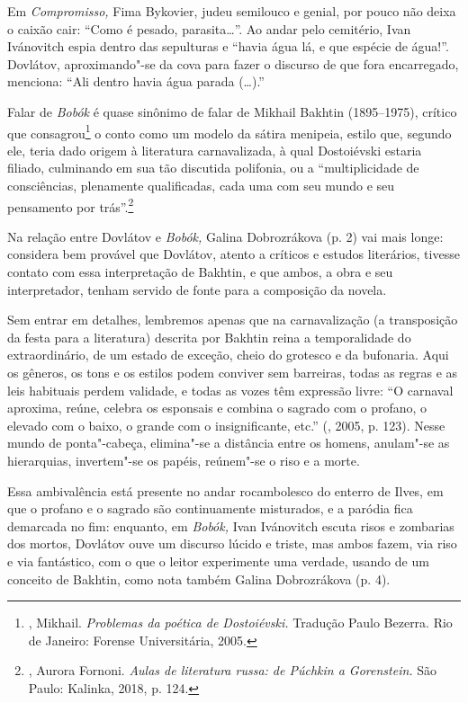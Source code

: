 Em \emph{Compromisso,} Fima Bykovier, judeu semilouco e genial, por
pouco não deixa o caixão cair: ``Como é pesado, parasita\ldots{}''. Ao andar
pelo cemitério, Ivan Ivánovitch espia dentro das sepulturas e ``havia
água lá, e que espécie de água!''. Dovlátov, aproximando"-se da cova para
fazer o discurso de que fora encarregado, menciona: ``Ali dentro havia
água parada (\ldots{}).''

Falar de \emph{Bobók} é quase sinônimo de falar de Mikhail Bakhtin
(1895--1975), crítico que consagrou\footnote{, Mikhail.
  \emph{Problemas da poética de Dostoiévski.} Tradução Paulo Bezerra.
  Rio de Janeiro: Forense Universitária, 2005.} o conto como um modelo
da sátira menipeia, estilo que, segundo ele, teria dado origem à
literatura carnavalizada, à qual Dostoiévski estaria filiado, culminando
em sua tão discutida polifonia, ou a ``multiplicidade de consciências,
plenamente qualificadas, cada uma com seu mundo e seu pensamento por
trás''.\footnote{, Aurora Fornoni. \emph{Aulas de literatura
  russa: de Púchkin a Gorenstein.} São Paulo: Kalinka, 2018, p. 124.}

Na relação entre Dovlátov e \emph{Bobók,} Galina Dobrozrákova (p. 2) vai
mais longe: considera bem provável que Dovlátov, atento a críticos e
estudos literários, tivesse contato com essa interpretação de Bakhtin, e
que ambos, a obra e seu interpretador, tenham servido de fonte para a
composição da novela.

Sem entrar em detalhes, lembremos apenas que na carnavalização (a
transposição da festa para a literatura) descrita por Bakhtin reina a
temporalidade do extraordinário, de um estado de exceção, cheio do
grotesco e da bufonaria. Aqui os gêneros, os tons e os estilos podem
conviver sem barreiras, todas as regras e as leis habituais perdem
validade, e todas as vozes têm expressão livre: ``O carnaval aproxima,
reúne, celebra os esponsais e combina o sagrado com o profano, o elevado
com o baixo, o grande com o insignificante, etc.'' (, 2005, p.
123). Nesse mundo de ponta"-cabeça, elimina"-se a distância entre os
homens, anulam"-se as hierarquias, invertem"-se os papéis, reúnem"-se o
riso e a morte.

Essa ambivalência está presente no andar rocambolesco do enterro de
Ilves, em que o profano e o sagrado são continuamente misturados, e a
paródia fica demarcada no fim: enquanto, em \emph{Bobók,} Ivan
Ivánovitch escuta risos e zombarias dos mortos, Dovlátov ouve um
discurso lúcido e triste, mas ambos fazem, via riso e via fantástico,
com o que o leitor experimente uma verdade, usando de um conceito de
Bakhtin, como nota também Galina Dobrozrákova (p. 4).

